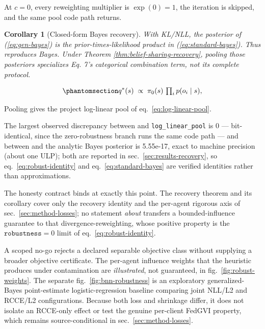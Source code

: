 \documentclass[
  english,
]{article}
\theoremstyle{plain}
\newtheorem{corollary}[theorem]{Corollary}
\theoremstyle{definition}
\theoremstyle{remark}
\theoremstyle{definition}
\begin{document}
At \(c=0\), every reweighting multiplier is \(\exp(0)=1\), the iteration
is skipped, and the same pool code path returns.

\begin{corollary}[Closed-form Bayes recovery]\label{cor:closed-form-bayes}
With KL/NLL, the posterior of (\ref{eq:gen-bayes}) is the prior-times-likelihood
product in (\ref{eq:standard-bayes}). Thus
 reproduces Bayes. Under Theorem
\ref{thm:belief-sharing-recovery}, pooling those posteriors specializes Eq. 7's
categorical combination term, not its complete protocol.
\end{corollary}

\begin{equation}\protect\phantomsection\label{eq:standard-bayes}{q^\ast(s) \;\propto\; \pi_0(s)\,\textstyle\prod_i p(o_i\mid s),}\end{equation}

Pooling gives the project log-linear pool of
eq.~\ref{eq:log-linear-pool}.

The largest observed discrepancy between
 and \texttt{log\_linear\_pool}
is 0 --- bit-identical, since the zero-robustness branch runs the same
code path --- and between  and
the analytic Bayes posterior is 5.55e-17, exact to machine precision
(about one ULP); both are reported in sec.~\ref{sec:results-recovery},
so eq.~\ref{eq:robust-identity} and eq.~\ref{eq:standard-bayes} are
verified identities rather than approximations.

The honesty contract binds at exactly this point. The recovery theorem
and its corollary cover only the recovery identity and the per-agent
rigorous axis of sec.~\ref{sec:method-losses}; no statement \emph{about
} transfers a bounded-influence guarantee to
that divergence-reweighting, whose positive property is the
\(\texttt{robustness}=0\) limit of eq.~\ref{eq:robust-identity}.

A scoped no-go rejects a declared separable objective class without
supplying a broader objective certificate. The per-agent influence
weights that the heuristic produces under contamination are
\emph{illustrated}, not guaranteed, in fig.~\ref{fig:robust-weights}.
The separate fig.~\ref{fig:bnn-robustness} is an exploratory
generalized-Bayes point-estimate logistic-regression baseline comparing
joint NLL/L2 and RCCE/L2 configurations. Because both loss and shrinkage
differ, it does not isolate an RCCE-only effect or test the genuine
per-client FedGVI property, which remains source-conditional in
sec.~\ref{sec:method-losses}.
\end{document}
